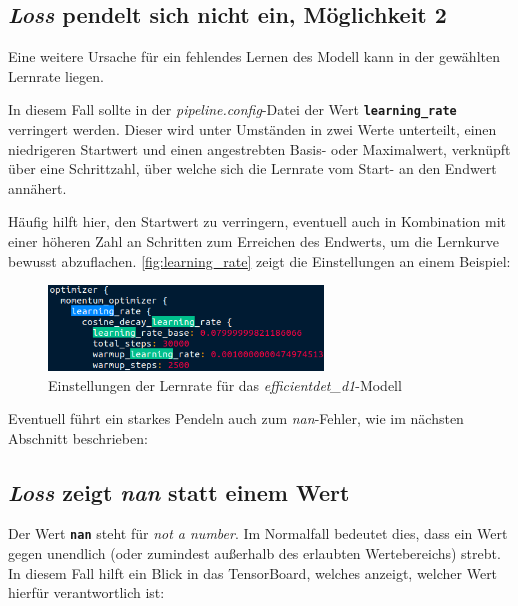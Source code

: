 \documentclass[12pt, oneside]{article}
\begin{document}
\subsection{\textit{Loss} pendelt sich nicht ein, Möglichkeit 2}

Eine weitere Ursache für ein fehlendes Lernen des Modell kann in der gewählten Lernrate liegen.

In diesem Fall sollte in der \textit{pipeline.config}-Datei der Wert \textbf{\texttt{learning\_rate}} verringert werden. Dieser wird unter Umständen in zwei Werte unterteilt, einen niedrigeren Startwert und einen angestrebten Basis- oder Maximalwert, verknüpft über eine Schrittzahl, über welche sich die Lernrate vom Start- an den Endwert annähert.

Häufig hilft hier, den Startwert zu verringern, eventuell auch in Kombination mit einer höheren Zahl an Schritten zum Erreichen des Endwerts, um die Lernkurve bewusst abzuflachen. \autoref{fig:learning_rate} zeigt die Einstellungen an einem Beispiel:

\begin{figure}[htbp]
	\centering
	\includegraphics[width = 0.65\textwidth]{Bilder/misc/learning_rate.png}
	\caption{Einstellungen der Lernrate für das \textit{efficientdet\_d1}-Modell}
	\label{fig:learning_rate}
\end{figure}
Eventuell führt ein starkes Pendeln auch zum \textit{nan}-Fehler, wie im nächsten Abschnitt beschrieben:

\subsection{\textit{Loss} zeigt \textit{nan} statt einem Wert}

Der Wert \textbf{\texttt{nan}} steht für \textit{not a number}. Im Normalfall bedeutet dies, dass ein Wert gegen unendlich (oder zumindest außerhalb des erlaubten Wertebereichs) strebt. In diesem Fall hilft ein Blick in das TensorBoard, welches anzeigt, welcher Wert hierfür verantwortlich ist:
\end{document}
